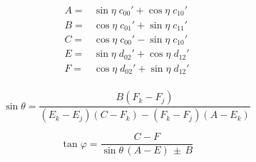 \begin{equation}
\label{eq:ABCEF}
\begin{split}
A =& \sin \eta \; c_{00}' + \cos \eta \; c_{10}' \\
B =& \cos \eta \; c_{01}' + \sin \eta \; c_{11}' \\
C =& \cos \eta \; c_{00}' - \sin \eta \; c_{10}' \\
E =& \sin \eta \; d_{02}' + \cos \eta \; d_{12}' \\
F =& \cos \eta \; d_{02}' + \sin \eta \; d_{12}' \\
\end{split}
\end{equation}

\begin{equation}
\label{eq:theta}
\sin \theta = \frac{B (F_k - F_j)}{(E_k - E_j)(C - F_k)-(F_k - F_j)(A - E_k)}
\end{equation}

\begin{equation}
\label{eq:varphi}
\tan \varphi = \frac{C-F}{\sin \theta \, (A-E) \, \pm \, B}
\end{equation}